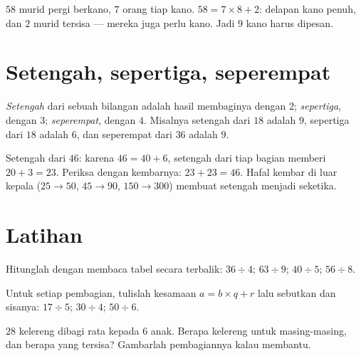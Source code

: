 \begin{example}\label{ex:g3:division:interpret}
$58$ murid pergi berkano, $7$ orang tiap kano. $58 = 7 \times 8 + 2$:
delapan kano penuh, dan $2$ murid tersisa --- mereka juga perlu
kano. Jadi $9$ kano harus dipesan.
\end{example}

\section{Setengah, sepertiga, seperempat}

\begin{definition}\label{def:g3:division:half}
\emph{Setengah} dari sebuah bilangan adalah hasil
membaginya dengan $2$; \emph{sepertiga}, dengan $3$;
\emph{seperempat}, dengan $4$. Misalnya setengah
dari $18$ adalah $9$, sepertiga dari $18$ adalah $6$, dan seperempat
dari $36$ adalah $9$.
\end{definition}

\begin{example}\label{ex:g3:division:double}
Setengah dari $46$: karena $46 = 40 + 6$, setengah dari tiap bagian
memberi $20 + 3 = 23$. Periksa dengan kembarnya: $23 + 23 = 46$.
Hafal kembar di luar kepala ($25 \to 50$, $45 \to 90$,
$150 \to 300$) membuat setengah menjadi seketika.
\end{example}

\section{Latihan}

\begin{exercise}[$\star$]\label{exo:g3:division:1}
Hitunglah dengan membaca tabel secara terbalik: $36 \div 4$; \quad
$63 \div 9$; \quad $40 \div 5$; \quad $56 \div 8$.
\end{exercise}

\begin{exercise}[$\star$]\label{exo:g3:division:2}
Untuk setiap pembagian, tulislah kesamaan $a = b \times q + r$ lalu
sebutkan  dan sisanya: $17 \div 5$; \quad $30 \div 4$; \quad
$50 \div 6$.
\end{exercise}

\begin{exercise}[$\star$]\label{exo:g3:division:3}
$28$ kelereng dibagi rata kepada $6$ anak. Berapa kelereng untuk
masing-masing, dan berapa yang tersisa? Gambarlah pembagiannya kalau membantu.
\end{exercise}


